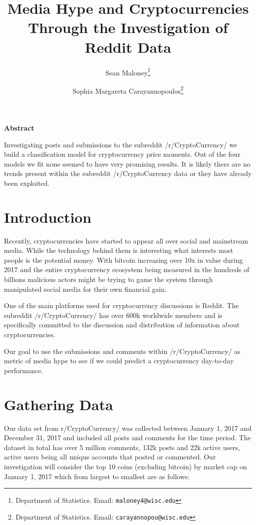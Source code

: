\documentclass[12pt]{article}
\begin{document}
\sloppy


\title{Media Hype and Cryptocurrencies Through the Investigation of Reddit Data}  

\author{
Sean Maloney\thanks{Department of Statistics.  Email: {\tt maloney4@wisc.edu}}  %
\and 
Sophia Margareta Carayannopoulos\thanks{Department of Statistics.  Email: {\tt  carayannopou@wisc.edu}}  %
}

\maketitle

\begin{center}
\textbf{Abstract}
\end{center}

Investigating posts and submissions to the subreddit /r/CryptoCurrency/ we build a classification model for cryptocurrency price moments. Out of the four models we fit none seemed to have very promising results. It is likely there are no trends present within the subreddit /r/CryptoCurrency data or they have already been exploited.

\thispagestyle{empty}

\newpage


\section{Introduction}\label{intro}
\indent \indent Recently, cryptocurrencies have started to appear all over social and mainstream media. While the technology behind them is interesting what interests most people is the potential money. With bitcoin increasing over 10x in value during 2017 and the entire cryptocurrency ecosystem being measured in the hundreds of billions malicious actors might be trying to game the system through manipulated social media for their own financial gain.

\indent One of the main platforms used for cryptocurrency discussions is Reddit. The subreddit /r/CryptoCurrency/ has over 600k worldwide members and is specifically committed to the discussion and distribution of information about cryptocurrencies. 

Our goal to use the submissions and comments within /r/CryptoCurrency/ as metric of media hype to see if we could predict a cryptocurrency day-to-day performance.

\section{Gathering Data}\label{datagather}
\indent \indent Our data set from  r/CryptoCurrency/ was collected between January 1, 2017 and December 31, 2017 and included all posts and comments for the time period. The dataset in total has over 5 million comments, 132k posts and 22k active users, active users being all unique accounts that posted or commented. Our investigation will consider the top 10 coins (excluding bitcoin) by market cap on January 1, 2017 which from largest to smallest are as follows: 
\end{document}
